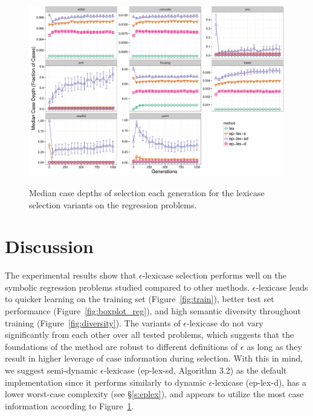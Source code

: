 \documentclass[twoside]{article}
\begin{document}
\begin{figure}
\centering
  \includegraphics[width=\textwidth]{figs/median_case_depth.pdf}\\
 \caption{Median case depths of selection each generation for the lexicase selection variants on the regression problems.}\label{fig:case_depth}
\end{figure}

\label{tbl:tables===}





\section{Discussion}\label{s:discuss}
The experimental results show that $\epsilon$-lexicase selection performs well on the symbolic regression problems studied compared to other methods. $\epsilon$-lexicase leads to quicker learning on the training set (Figure~\ref{fig:train}), better test set performance (Figure~\ref{fig:boxplot_reg}), and high semantic diversity throughout training (Figure~\ref{fig:diversity}). The variants of $\epsilon$-lexicase do not vary significantly from each other over all tested problems, which suggests that the foundations of the method are robust to different definitions of $\epsilon$ as long as they result in higher leverage of case information during selection. With this in mind, we suggest semi-dynamic $\epsilon$-lexicase (ep-lex-sd, Algorithm 3.2) as the default implementation since it performs similarly to dynamic $\epsilon$-lexicase (ep-lex-d), has a lower worst-case complexity (see \S\ref{s:eplex}), and appears to utilize the most case information according to Figure~\ref{fig:case_depth}. 
 
\end{document}
